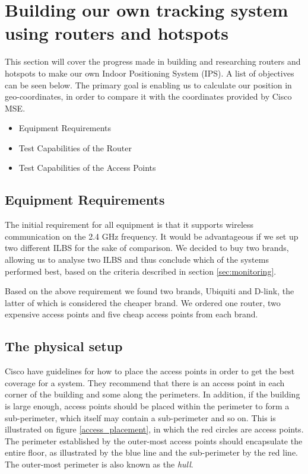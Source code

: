 \section{Building our own tracking system using routers and hotspots}
This section will cover the progress made in building and researching routers and hotspots to make our own Indoor Positioning System (IPS). A list of objectives can be seen below. The primary goal is enabling us to calculate our position in geo-coordinates, in order to compare it with the coordinates provided by Cisco MSE.

\begin{itemize}
	\item Equipment Requirements
	\item Test Capabilities of the Router
	\item Test Capabilities of the Access Points
\end{itemize}

\subsection*{Equipment Requirements}
The initial requirement for all equipment is that it supports wireless communication on the 2.4 GHz frequency. It would be advantageous if we set up two different ILBS for the sake of comparison. We decided to buy two brands, allowing us to analyse two ILBS and thus conclude which of the systems performed best, based on the criteria described in section \ref{sec:monitoring}.

Based on the above requirement we found two brands, Ubiquiti and D-link, the latter of which is considered the cheaper brand. We ordered one router, two expensive access points and five cheap access points from each brand.

\subsection*{The physical setup}
Cisco\cite{access_point_placement} have guidelines for how to place the access points in order to get the best coverage for a system. They recommend that there is an access point in each corner of the building and some along the perimeters. In addition, if the building is large enough, access points should be placed within the perimeter to form a sub-perimeter, which itself may contain a sub-perimeter and so on. This is illustrated on figure \ref{access_placement}, in which the red circles are access points. The perimeter established by the outer-most access points should encapsulate the entire floor, as illustrated by the blue line and the sub-perimeter by the red line. The outer-most perimeter is also known as the \textit{hull}\cite{access_point_placement}.

